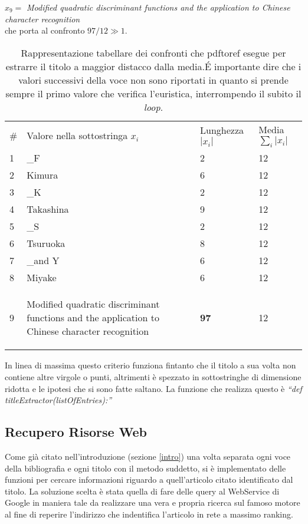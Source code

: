 $ x_9= $ \textit{Modified quadratic discriminant functions and the application to Chinese character recognition}\\

che porta al confronto $97/12 \gg 1$.

\begin{table}\label{tab:title}
\begin{center}
\begin{tabular}{l|l|l|l}
	\#  & Valore nella sottostringa $x_i$ & Lunghezza $|x_i|$ & Media $  \sum_i |x_i|$ \\
	1 & \_F & 2 & 12 \\
	2 & Kimura & 6 & 12 \\
	3 & \_K & 2 & 12 \\
	4 & Takashina & 9 & 12 \\
	5 & \_S & 2 & 12 \\
	6 & Tsuruoka & 8 & 12 \\
	7 & \_and Y & 6 & 12 \\
	8 & Miyake & 6 & 12 \\
	9 & \begin{scriptsize}Modified quadratic discriminant functions and the  application to Chinese character recognition\end{scriptsize} & \textbf{97} & 12 \\
\end{tabular}
\caption{Rappresentazione tabellare dei confronti che pdftoref esegue per estrarre il titolo a maggior distacco dalla media.\'E importante dire che i valori successivi della voce non sono riportati in quanto si prende sempre il primo valore che verifica l'euristica, interrompendo il subito il \textit{loop}.}
\label{label}
\end{center}
\end{table}








In linea di massima questo criterio funziona fintanto che il titolo a sua volta non contiene altre virgole o punti, altrimenti è spezzato in sottostringhe di dimensione ridotta e le ipotesi che si sono fatte saltano. La funzione che realizza questo è \textit{``def titleExtractor(listOfEntries):''}


\subsection{Recupero Risorse Web}

Come già citato nell'introduzione (sezione \ref{intro}) una volta separata ogni voce della bibliografia e ogni titolo con il metodo suddetto, si è implementato delle funzioni per cercare informazioni riguardo a quell'articolo citato identificato dal titolo. La soluzione scelta è stata quella di fare delle query al WebService di Google in maniera tale da realizzare una vera e propria ricerca sul famoso motore al fine di reperire l'indirizzo che indentifica l'articolo in rete a massimo ranking.


